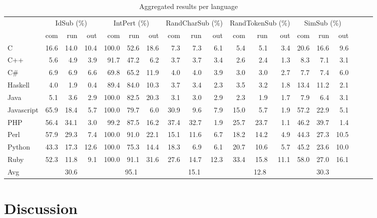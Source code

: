 \documentclass[10pt]{sigplanconf}
\begin{document}
\begin{table*}
\begin{center}
\begin{tabular}{ l r r r r r r r r r r r r r r r r r r }
 & \multicolumn{3}{c}{IdSub (\%)} & \multicolumn{3}{c}{IntPert (\%)} & \multicolumn{3}{c}{RandCharSub (\%)} & \multicolumn{3}{c}{RandTokenSub (\%)} & \multicolumn{3}{c}{SimSub (\%)}\\
 & com & run & out & com & run & out & com & run & out & com & run & out & com & run & out\\
\hline
C & 16.6 & 14.0 & 10.4  & 100.0 & 52.6 & 18.6  & 7.3 & 7.3 & 6.1  & 5.4 & 5.1 & 3.4  & 20.6 & 16.6 & 9.6 \\
C++ & 5.6 & 4.9 & 3.9  & 91.7 & 47.2 & 6.2  & 3.7 & 3.7 & 3.4  & 2.6 & 2.4 & 1.3  & 8.3 & 7.1 & 3.1 \\
C\# & 6.9 & 6.9 & 6.6  & 69.8 & 65.2 & 11.9  & 4.0 & 4.0 & 3.9  & 3.0 & 3.0 & 2.7  & 7.7 & 7.4 & 6.0 \\
Haskell & 4.0 & 1.9 & 0.4  & 89.4 & 84.0 & 10.3  & 3.7 & 3.4 & 2.3  & 3.5 & 3.2 & 1.8  & 13.4 & 11.2 & 2.1 \\
Java & 5.1 & 3.6 & 2.9  & 100.0 & 82.5 & 20.3  & 3.1 & 3.0 & 2.9  & 2.3 & 1.9 & 1.7  & 7.9 & 6.4 & 3.1 \\
Javascript & 65.9 & 18.4 & 5.7  & 100.0 & 79.7 & 6.0  & 30.9 & 9.6 & 7.9  & 15.0 & 5.7 & 1.9  & 57.2 & 22.9 & 5.1 \\
PHP & 56.4 & 34.1 & 3.0  & 99.2 & 87.5 & 16.2  & 37.4 & 32.7 & 1.9  & 25.7 & 23.7 & 1.1  & 46.2 & 39.7 & 1.4 \\
Perl & 57.9 & 29.3 & 7.4  & 100.0 & 91.0 & 22.1  & 15.1 & 11.6 & 6.7  & 18.2 & 14.2 & 4.9  & 44.3 & 27.3 & 10.5 \\
Python & 43.3 & 17.3 & 12.6  & 100.0 & 75.3 & 14.4  & 18.3 & 6.9 & 6.1  & 20.7 & 10.6 & 5.7  & 45.2 & 23.6 & 10.0 \\
Ruby & 52.3 & 11.8 & 9.1  & 100.0 & 91.1 & 31.6  & 27.6 & 14.7 & 12.3  & 33.4 & 15.8 & 11.1  & 58.0 & 27.0 & 16.1 \\
\hline
Avg & \multicolumn{3}{c}{30.6} & \multicolumn{3}{c}{95.1} & \multicolumn{3}{c}{15.1} & \multicolumn{3}{c}{12.8} & \multicolumn{3}{c}{30.3} \\
\end{tabular}
\end{center}
\caption{Aggregated results per language}
\label{tbl:aggregated-per-language}
\end{table*}

\section{Discussion} %
\label{sec:discussion}
\end{document}
